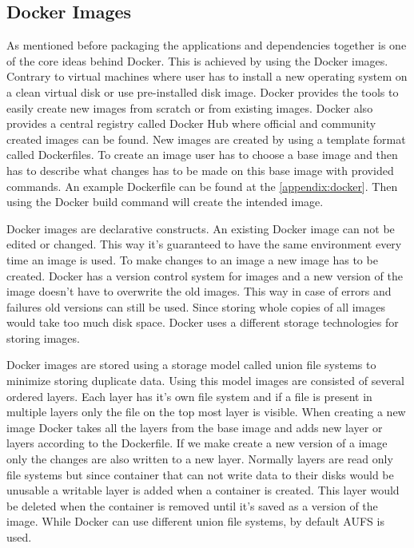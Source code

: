 \documentclass[12pt,oneandhalf,chaparabic,ceng,ms,eng,oneside,pntc]{gsufbe}
\begin{document}
\subsection{Docker Images}
As mentioned before packaging the applications and dependencies together is one of the core ideas
behind Docker.  This is achieved by using the Docker images.  Contrary to virtual machines where user
has to install a new operating system on a clean virtual disk or use pre-installed disk image.  Docker 
provides the tools to easily create new images from scratch or from existing images.  Docker also
provides a central registry called Docker Hub where official and community created images can be found.
New images are created by using a template format called Dockerfiles.  To create an image user has to
choose a base image and then has to describe what changes has to be made on this base image with
provided commands.  An example Dockerfile can be found at the \ref{appendix:docker}.  Then using the
Docker build command will create the intended image.

Docker images are declarative constructs.  An existing Docker image can not be edited or changed.  This
way it's guaranteed to have the same environment every time an image is used.  To make changes to an
image a new image has to be created.  Docker has a version control system for images and a new version
of the image doesn't have to overwrite the old images.  This way in case of errors and failures old
versions can still be used.  Since storing whole copies of all images would take too much disk space.
Docker uses a different storage technologies for storing images.

Docker images are stored using a storage model called union file systems to minimize storing duplicate
data.  Using this model images are consisted of several ordered layers.  Each layer has it's own file
system and if a file is present in multiple layers only the file on the top most layer is visible.  When
creating a new image Docker takes all the layers from the base image and adds new layer or layers
according to the Dockerfile.  If we make create a new version of a image only the changes are also 
written to a new layer.  Normally layers are read only file systems but since container that can not
write data to their disks would be unusable a writable layer is added when a container is created.  This
layer would be deleted when the container is removed until it's saved as a version of the image.
While Docker can use different union file systems, by default AUFS is used.
\end{document}
